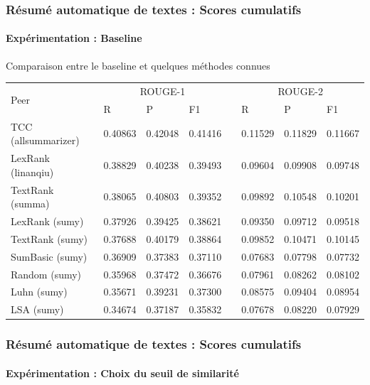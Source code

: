 \documentclass[xcolor=table]{beamer}
\begin{document}
\begin{frame}
\frametitle{Résumé automatique de textes : Scores cumulatifs}
\framesubtitle{Expérimentation : Baseline}

\begin{block}{Comparaison entre le baseline et quelques méthodes connues}
	\scriptsize
	\begin{tabular}{llllllll}
		
		\hline \hline
		
		\multirow{2}{*}{Peer} & \multicolumn{3}{c}{ROUGE-1}  &&  \multicolumn{3}{c}{ROUGE-2}  \\
		\cline{2-4} \cline{6-8} \noalign{\smallskip}
		& R & P & F1 && R & P & F1 \\
		
		\hline
		
		TCC (allsummarizer) & \color{red}0.40863 & \color{red}0.42048 & \color{red}0.41416 && \color{red}0.11529 & \color{red}0.11829 & \color{red}0.11667 \\
		LexRank (linanqiu) & 0.38829 & 0.40238 & 0.39493 && 0.09604 & 0.09908 & 0.09748 \\
		TextRank (summa) & 0.38065 & 0.40803 & 0.39352 && 0.09892 & 0.10548 & 0.10201 \\
		LexRank (sumy) & 0.37926 & 0.39425 & 0.38621 && 0.09350 & 0.09712 & 0.09518 \\
		TextRank (sumy) & 0.37688 & 0.40179 & 0.38864 && 0.09852 & 0.10471 & 0.10145 \\
		SumBasic (sumy) & 0.36909 & 0.37383 & 0.37110 && 0.07683 & 0.07798 & 0.07732 \\
		Random (sumy) & 0.35968 & 0.37472 & 0.36676 && 0.07961 & 0.08262 & 0.08102 \\
		Luhn (sumy) & 0.35671 & 0.39231 & 0.37300 && 0.08575 & 0.09404 & 0.08954 \\
		LSA (sumy) & 0.34674 & 0.37187 & 0.35832 && 0.07678 & 0.08220 & 0.07929 \\
		\hline \hline
	\end{tabular} 
\end{block}
	
\end{frame}

\begin{frame}
\frametitle{Résumé automatique de textes : Scores cumulatifs}
\framesubtitle{Expérimentation : Choix du seuil de similarité}
	
\begin{center}
\end{center}
	
\end{frame}
\end{document}
